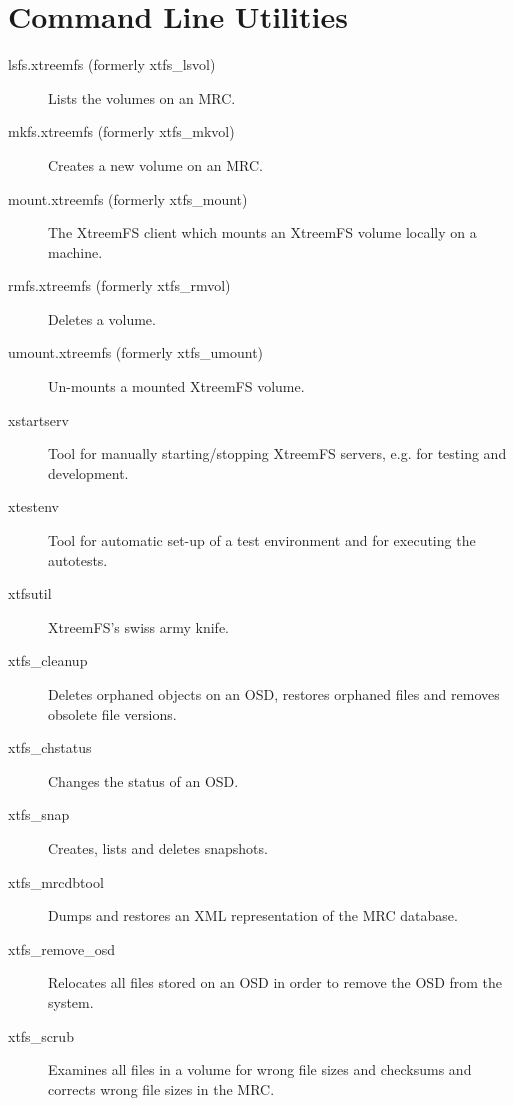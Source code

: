 \documentclass[a4paper,10pt]{book}
\begin{document}
\chapter{Command Line Utilities}
\label{sec:cli_utils}

\begin{description}
 \item[lsfs.xtreemfs (formerly xtfs\_lsvol)] Lists the volumes on an MRC.
 \item[mkfs.xtreemfs (formerly xtfs\_mkvol)] Creates a new volume on an MRC.
 \item[mount.xtreemfs (formerly xtfs\_mount)] The XtreemFS client which mounts an XtreemFS volume locally on a machine.
 \item[rmfs.xtreemfs (formerly xtfs\_rmvol)] Deletes a volume.
 \item[umount.xtreemfs (formerly xtfs\_umount)] Un-mounts a mounted XtreemFS volume.
 \item[xstartserv] Tool for manually starting/stopping XtreemFS servers, e.g. for testing and development.
 \item[xtestenv] Tool for automatic set-up of a test environment and for executing the autotests.
 \item[xtfsutil] XtreemFS's swiss army knife.
 \item[xtfs\_cleanup] Deletes orphaned objects on an OSD, restores orphaned files and removes obsolete file versions.
 \item[xtfs\_chstatus] Changes the status of an OSD.
 \item[xtfs\_snap] Creates, lists and deletes snapshots.
 \item[xtfs\_mrcdbtool] Dumps and restores an XML representation of the MRC database.
 \item[xtfs\_remove\_osd] Relocates all files stored on an OSD in order to remove the OSD from the system.
 \item[xtfs\_scrub] Examines all files in a volume for wrong file sizes and checksums and corrects wrong file sizes in the MRC.
\end{description}

\printindex
\end{document}

